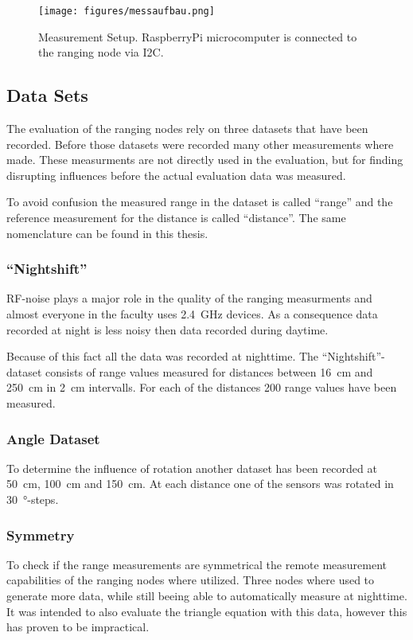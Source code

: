 \begin{figure}[H]
	\centering
	\texttt{[image: figures/messaufbau.png]}
	\caption[ Measurement Setup ]{ Measurement Setup. RaspberryPi microcomputer is connected to the ranging node via I2C. }
	\label{aufbau}
\end{figure}

\subsection{Data Sets}

The evaluation of the ranging nodes rely on three datasets that have been recorded.
Before those datasets were recorded many other measurements where made.
These measurments are not directly used in the evaluation, but for finding disrupting influences before the actual evaluation data was measured.

To avoid confusion the measured range in the dataset is called \enquote{range} and the reference measurement for the distance is called \enquote{distance}.
The same nomenclature can be found in this thesis.

\subsubsection*{\enquote{Nightshift}}
RF-noise plays a major role in the quality of the ranging measurments and almost everyone in the faculty uses \SI{2.4}{GHz} devices.
As a consequence data recorded at night is less noisy then data recorded during daytime.

Because of this fact all the data was recorded at nighttime.
The \enquote{Nightshift}-dataset consists of range values measured for distances between \SI{16}{cm} and \SI{250}{cm} in \SI{2}{cm} intervalls.
For each of the distances 200 range values have been measured.

\subsubsection*{Angle Dataset}
To determine the influence of rotation another dataset has been recorded at \SI{50}{cm}, \SI{100}{cm} and \SI{150}{cm}.
At each distance one of the sensors was rotated in \SI{30}{\degree}-steps.

\subsubsection*{Symmetry}
To check if the range measurements are symmetrical the remote measurement capabilities of the ranging nodes where utilized.
Three nodes where used to generate more data, while still beeing able to automatically measure at nighttime.
It was intended to also evaluate the triangle equation with this data, however this has proven to be impractical.


